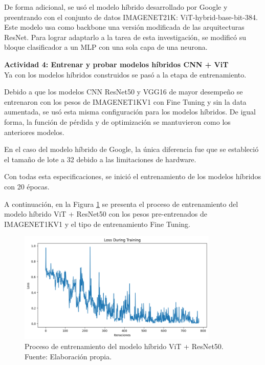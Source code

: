 De forma adicional, se usó el modelo híbrido desarrollado por Google y preentrando con el conjunto de datos IMAGENET21K: ViT-hybrid-base-bit-384. Este modelo usa como backbone una versión modificada de las arquitecturas ResNet. Para lograr adaptarlo a la tarea de esta investigación, se modificó su bloque clasificador a un MLP con una sola capa de una neurona.

\textbf{Actividad 4: Entrenar y probar modelos híbridos CNN + ViT}
\\
Ya con los modelos híbridos construidos se pasó a la etapa de entrenamiento.

Debido a que los modelos CNN ResNet50 y VGG16 de mayor desempeño se entrenaron con los pesos de IMAGENET1KV1 con Fine Tuning y sin la data aumentada, se usó esta misma configuración para los modelos híbridos. De igual forma, la función de pérdida y de optimización se mantuvieron como los anteriores modelos.

En el caso del modelo híbrido de Google, la única diferencia fue que se estableció el tamaño de lote a 32 debido a las limitaciones de hardware.

Con todas esta especificaciones, se inició el entrenamiento de los modelos híbridos con 20 épocas. 

A continuación, en la Figura \ref{4:fig168} se presenta el proceso de entrenamiento del modelo híbrido ViT + ResNet50 con los pesos pre-entrenados de IMAGENET1KV1 y el tipo de entrenamiento Fine Tuning.

\begin{figure}[H]
	\begin{center}
		\includegraphics[width=0.85\textwidth]{4/figures/modelH_resnet_train.PNG}
		\caption[Proceso de entrenamiento del modelo híbrido ViT + ResNet50]{Proceso de entrenamiento del modelo híbrido ViT + ResNet50. \\
		Fuente: Elaboración propia.}
		\label{4:fig168}
	\end{center}
\end{figure}


